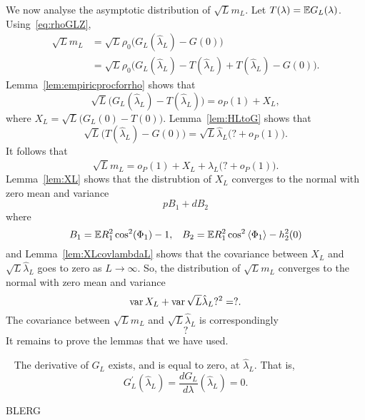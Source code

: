 \documentclass[journal]{IEEEtran}
\begin{document}
We now analyse the asymptotic distribution of $\sqrt{L} m_L$.  Let $T(\lambda) = {\mathbb E} G_L(\lambda)$.  Using~\eqref{eq:rhoGLZ},
\begin{align*}
\sqrt{L} m_L &= \sqrt{L} \rho_0 \big( G_L(\hat{\lambda}_L) - G(0) \big) \\
&= \sqrt{L} \rho_0 \big( G_L(\hat{\lambda}_L) - T(\hat{\lambda}_L) + T(\hat{\lambda}_L) - G(0) \big).
\end{align*}
Lemma~\ref{lem:empiricprocforrho} shows that 
\[
\sqrt{L}\big( G_L(\hat{\lambda}_L) - T(\hat{\lambda}_L)  \big) = o_P(1) + X_L,
\]
where $X_L = \sqrt{L}\big( G_L(0) - T(0)  \big)$.  Lemma~\ref{lem:HLtoG} shows that
\[
\sqrt{L}\big( T(\hat{\lambda}_L) - G(0) \big) = \sqrt{L} \hat{\lambda}_L \big( ? + o_P(1) \big).
\]
It follows that
\[
\sqrt{L} m_L = o_P(1) + X_L  + \hat{\lambda}_L \big( ? + o_P(1) \big).
\]
Lemma~\ref{lem:XL} shows that the distrubtion of $X_L$ converges to the normal with zero mean and variance
\[
 p B_1 + d B_2 
\]
where
\[
B_1 = {\mathbb E} R_1^2 \cos^2(\Phi_1) - 1, \;\;\; B_2 = {\mathbb E} R_1^2 \cos^2\left\langle \Phi_1 \right\rangle - h_2^2(0)
\]
and Lemma~\ref{lem:XLcovlambdaL} shows that the covariance between $X_L$ and $\sqrt{L}\hat{\lambda}_L$ goes to zero as $L\rightarrow\infty$.  So, the distribution of $\sqrt{L}m_L$ converges to the normal with zero mean and variance
\[
\operatorname{var} X_L + \operatorname{var} \sqrt{L} \hat{\lambda}_L ?^2 = ?.
\]
The covariance between $\sqrt{L}m_L$ and $\sqrt{L}\hat{\lambda}_L$ is correspondingly
\[
?
\]
It remains to prove the lemmas that we have used.

\begin{lemma}~\label{lem:diffatlambdaL}
The derivative of $G_L$ exists, and is equal to zero, at $\hat{\lambda}_L$.  That is,
\[
G_L^\prime(\hat{\lambda}_L) = \frac{d G_L}{d \lambda}(\hat{\lambda}_L) = 0.
\]
\end{lemma}
\begin{IEEEproof}
BLERG
\end{IEEEproof}
\end{document}
